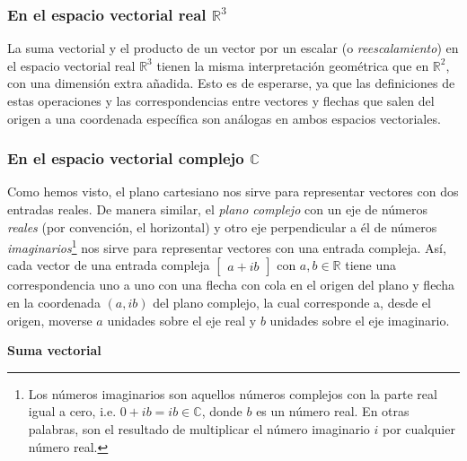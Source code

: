 \documentclass[12pt]{article}
\begin{document}
\subsubsection{En el espacio vectorial real \texorpdfstring{$\mathbb{R}^3$}{TEXT}}

La suma vectorial y el producto de un vector por un escalar (o \emph{reescalamiento}) en el espacio vectorial real $\mathbb{R}^3$ tienen la misma interpretación geométrica que en $\mathbb{R}^2$, con una dimensión extra añadida. Esto es de esperarse, ya que las definiciones de estas operaciones y las correspondencias entre vectores y flechas que salen del origen a una coordenada específica son análogas en ambos espacios vectoriales.

\subsubsection{En el espacio vectorial complejo \texorpdfstring{$\mathbb{C}$}{TEXT}}

Como hemos visto, el plano cartesiano nos sirve para representar vectores con dos entradas reales. De manera similar, el \emph{plano complejo} \textemdash con un eje de números \emph{reales} (por convención, el horizontal) y otro eje perpendicular a él de números \emph{imaginarios}\footnote{Los números imaginarios son aquellos números complejos con la parte real igual a cero, i.e. $0+ib=ib\in\mathbb{C}$, donde $b$ es un número real. En otras palabras, son el resultado de multiplicar el número imaginario $i$ por cualquier número real.}\textemdash\hspace{0.5mm} nos sirve para representar vectores con una entrada compleja. Así, cada vector de una entrada compleja $\begin{bmatrix}a+ib\end{bmatrix}$ con $a,b\in\mathbb{R}$ tiene una correspondencia uno a uno con una flecha con cola en el origen del plano y flecha en la coordenada $(a,ib)$ del plano complejo, la cual corresponde a, desde el origen, moverse $a$ unidades sobre el eje real y $b$ unidades sobre el eje imaginario.

\vspace{3mm}
\textbf{Suma vectorial}
\vspace{3mm}
\end{document}
